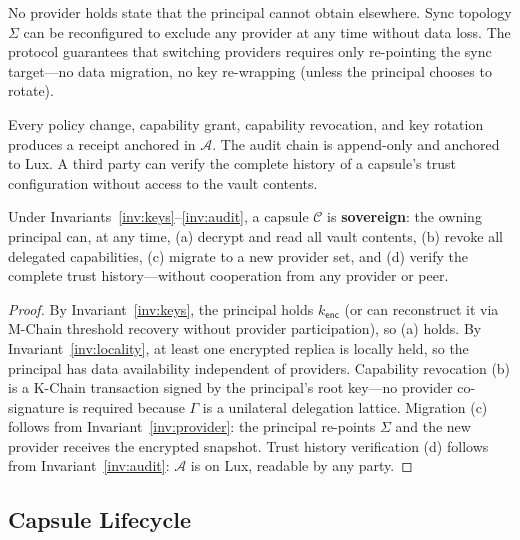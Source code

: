 \begin{invariant}\label{inv:provider}
No provider holds state that the principal cannot obtain elsewhere. Sync
topology $\Sigma$ can be reconfigured to exclude any provider at any time
without data loss. The protocol guarantees that switching providers requires
only re-pointing the sync target---no data migration, no key re-wrapping
(unless the principal chooses to rotate).
\end{invariant}

\begin{invariant}\label{inv:audit}
Every policy change, capability grant, capability revocation, and key rotation
produces a receipt anchored in $\mathcal{A}$. The audit chain is append-only
and anchored to Lux. A third party can verify the complete history of a
capsule's trust configuration without access to the vault contents.
\end{invariant}

\begin{theorem}\label{thm:sovereignty}
Under Invariants~\ref{inv:keys}--\ref{inv:audit}, a capsule $\mathcal{C}$ is
\textbf{sovereign}: the owning principal can, at any time, (a) decrypt and read
all vault contents, (b) revoke all delegated capabilities, (c) migrate to a
new provider set, and (d) verify the complete trust history---without cooperation
from any provider or peer.
\end{theorem}

\begin{proof}
By Invariant~\ref{inv:keys}, the principal holds $k_{\mathsf{enc}}$ (or can
reconstruct it via M-Chain threshold recovery without provider participation),
so (a) holds. By Invariant~\ref{inv:locality}, at least one encrypted replica
is locally held, so the principal has data availability independent of providers.
Capability revocation (b) is a K-Chain transaction signed by the principal's root
key---no provider co-signature is required because $\Gamma$ is a unilateral
delegation lattice. Migration (c) follows from Invariant~\ref{inv:provider}:
the principal re-points $\Sigma$ and the new provider receives the encrypted
snapshot. Trust history verification (d) follows from Invariant~\ref{inv:audit}:
$\mathcal{A}$ is on Lux, readable by any party.
\end{proof}

\subsection{Capsule Lifecycle}

